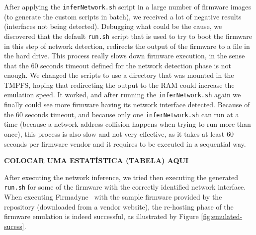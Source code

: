 After applying the {\tt inferNetwork.sh} script in a large number of firmware images (to generate the custom scripts in batch), we received a lot of negative results (interfaces not being detected). Debugging what could be the cause, we discovered that the default {\tt run.sh} script that is used to try to boot the firmware in this step of network detection, redirects the output of the firmware to a file in the hard drive. This process really slows down firmware execution, in the sense that the 60 seconds timeout defined for the network detection phase is not enough. We changed the scripts to use a directory that was mounted in the TMPFS, hoping that redirecting the output to the RAM could increase the emulation speed. It worked, and after running the {\tt inferNetwork.sh} again we finally could see more firmware having its network interface detected. Because of the 60 seconds timeout, and because only one {\tt inferNetwork.sh} can run at a time (because a network address collision happens when trying to run more than once), this process is also slow and not very effective, as it takes at least 60 seconds per firmware vendor and it requires to be executed in a sequential way.

\textbf{COLOCAR UMA ESTATÍSTICA (TABELA) AQUI}


After executing the network inference, we tried then executing the generated {\tt run.sh} for some of the firmware with the correctly identified network interface. When executing Firmadyne~\cite{firmadyne} with the sample firmware provided by the repository (downloaded from a vendor website), the re-hosting phase of the firmware emulation is indeed successful, as illustrated by Figure \ref{fig:emulated-sucess}.

